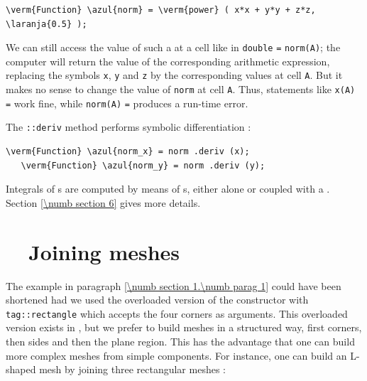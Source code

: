 \begin{Verbatim}[commandchars=\\\{\},formatcom=\small\tt,baselinestretch=0.94]
   \verm{Function} \azul{norm} = \verm{power} ( x*x + y*y + z*z, \laranja{0.5} );
\end{Verbatim}

We can still access the value of such a {\small\tt{}} at a cell like in
{\small\tt double} {\small\tt {}} {\small\tt =} {\small\tt norm(A)};
the computer will return the value of the corresponding arithmetic expression,
replacing the symbols {\small\tt x}, {\small\tt y} and {\small\tt z} by the corresponding
values at cell {\small\tt A}.
But it makes no sense to change the value of {\small\tt norm} at cell {\small\tt A}.
Thus, statements like {\small\tt x(A)} {\small\tt =} {\small\tt{}} work fine,
while {\small\tt norm(A)} {\small\tt =} {\small\tt{}} produces a run-time error.

The {\small\tt{}::deriv} method performs symbolic differentiation :

\begin{Verbatim}[commandchars=\\\{\},formatcom=\small\tt,baselinestretch=0.94]
   \verm{Function} \azul{norm_x} = norm .deriv (x);
   \verm{Function} \azul{norm_y} = norm .deriv (y);
\end{Verbatim}

Integrals of {\small\tt{}}s are computed by means of {\small\tt{}}s,
either alone or coupled with a {\small\tt{}}.
Section \ref{\numb section 6} gives more details.


\section{~~Joining meshes}\label{\numb section 1.\numb parag 4}

The example in paragraph \ref{\numb section 1.\numb parag 1} could have been shortened
had we used the overloaded version of the {\small\tt {}} constructor with
{\small\tt \textcolor{tag}{tag}::rectangle} which accepts the four corners as arguments. 
This overloaded version exists in \maniFEM, but we prefer to build meshes in a structured way, 
first corners, then sides and then the plane region. 
This has the advantage that one can build more complex meshes from simple components. 
For instance, one can build an L-shaped mesh by joining three rectangular meshes :

